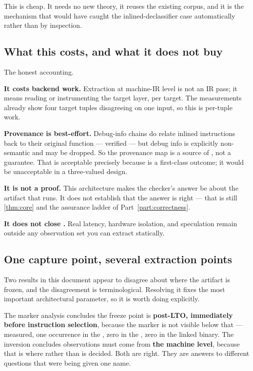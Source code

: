 This is cheap. It needs no new theory, it reuses the existing corpus, and it is
the mechanism that would have caught the inlined-declassifier case automatically
rather than by inspection.

\subsection{What this costs, and what it does not buy}

The honest accounting.

\textbf{It costs backend work.} Extraction at machine-IR level is not an IR pass;
it means reading or instrumenting the target layer, per target. The measurements
already show four target tuples disagreeing on one input, so this is per-tuple
work.

\textbf{Provenance is best-effort.} Debug-info  chains do relate
inlined instructions back to their original function --- verified --- but debug
info is explicitly non-semantic and may be dropped. So the provenance map is a
source of \Unknown{}, not a guarantee. That is acceptable precisely because
\Unknown{} is a first-class outcome; it would be unacceptable in a three-valued
design.

\textbf{It is not a proof.} This architecture makes the checker's answer be about
the artifact that runs. It does not establish that the answer is right --- that
is still \cref{thm:core} and the assurance ladder of
Part~\ref{part:correctness}.

\textbf{It does not close .} Real latency, hardware isolation, and
speculation remain outside any observation set you can extract statically.

\subsection{One capture point, several extraction points}
\label{sec:capture}

Two results in this document appear to disagree about where the artifact is
frozen, and the disagreement is terminological. Resolving it fixes the most
important architectural parameter, so it is worth doing explicitly.

The marker analysis concludes the freeze point is \textbf{post-LTO, immediately
before instruction selection}, because the marker is not visible below that ---
measured, one occurrence in the , zero in the , zero in the
linked binary. The inversion concludes observations must come from \textbf{the
machine level}, because that is where  rather than  is
decided. Both are right. They are answers to different questions that were being
given one name.

